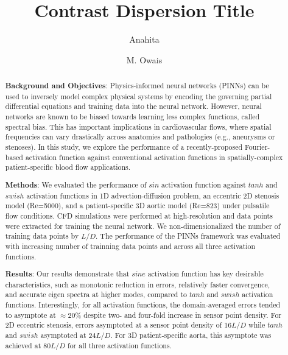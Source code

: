 \documentclass[times,twocolumn,final]{elsarticle}
\begin{document}

\begin{frontmatter}

\title{Contrast Dispersion Title }%


\author[1]{Anahita }

\author[2]{M. Owais }


\address[1]{Department of Electrical, Computer and Biomedical Engineering, Toronto Metropolitan University, 350 Victoria Street, Toronto, M5B 0A1, Canada}




\begin{abstract}
\textbf{Background and Objectives}: Physics-informed neural networks (PINNs) can be used to inversely model complex physical systems by encoding the governing partial differential equations and training data into the neural network. However, neural networks are known to be biased towards learning less complex functions, called spectral bias. This has important implications in cardiovascular flows, where spatial frequencies can vary drastically across anatomies and pathologies (e.g., aneurysms or stenoses). In this study, we explore the performance of a recently-proposed Fourier-based activation function against conventional activation functions in spatially-complex patient-specific blood flow applications.

\textbf{Methods}: We evaluated the performance of $sin$ activation function against $tanh$ and $swish$ activation functions in 1D advection-diffusion problem, an eccentric 2D stenosis model (Re=5000), and a patient-specific 3D aortic model (Re=823) under pulsatile flow conditions. CFD simulations were performed at high-resolution and data points were extracted for training the neural network. We non-dimensionalized the number of training data points by $L/D$. The performance of the PINNs framework was evaluated with increasing number of trainning data points and across all three activation functions. 

\textbf{Results}: Our results demonstrate that $sine$ activation function has key desirable characteristics, such as monotonic reduction in errors,  relatively faster convergence, and accurate eigen spectra at higher modes, compared to $tanh$ and $swish$ activation functions. Interestingly, for all activation functions, the domain-averaged errors tended to asymptote at $\approx 20\%$ despite two- and four-fold increase in sensor point density. For 2D eccentric stenosis, errors asymptoted at a sensor point density of $16L/D$ while $tanh$ and $swish$ asymptoted at $24L/D$. For 3D patient-specific aorta, this asymptote was achieved at $80L/D$ for all three activation functions. 


\end{abstract}
\end{frontmatter}
\end{document}
